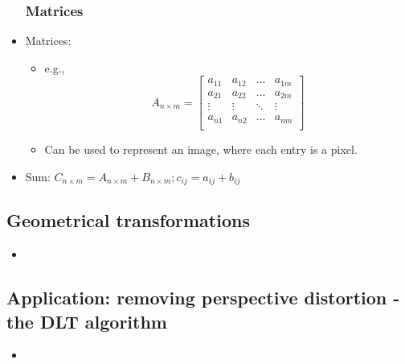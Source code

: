 \begin{itemize}
\subsubsection{Matrices}
	\item Matrices:
	\begin{itemize}
		\item e.g.,
		$$A_{n\times m}=\begin{bmatrix}
			a_{11} & a_{12} &\ldots & a_{1m}\\
			a_{21} & a_{22} &\ldots & a_{2m}\\
			\vdots &\vdots &\ddots & \vdots\\
			a_{n1} & a_{n2} &\ldots &a_{nm}\\
		\end{bmatrix}$$
		\item Can be used to represent an image, where each entry is a pixel.		
	\end{itemize}
	\item Sum: $C_{n\times m}=A_{n\times m}+B_{n\times m}; c_{ij}=a_{ij}+b_{ij}$
\end{itemize}

\subsection{Geometrical transformations}
\begin{itemize}
	\item 
\end{itemize}

\subsection{Application: removing perspective distortion - the DLT algorithm}
\begin{itemize}
	\item 
\end{itemize}